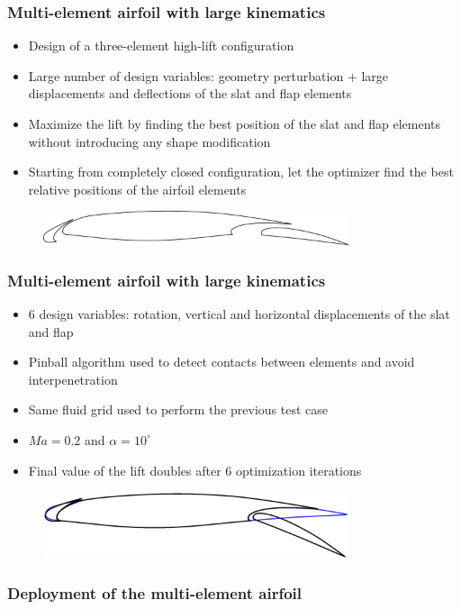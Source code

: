 
\begin{frame}
  \frametitle{Multi-element airfoil with large kinematics}
  \begin{itemize}
  \item Design of a three-element high-lift configuration
  \item Large number of design variables: geometry perturbation + 
        large displacements and deflections of the slat and flap elements
  \item Maximize the lift by finding the best position of the slat and flap
    elements without introducing any shape modification
  \item Starting from completely closed configuration, let the optimizer find 
    the best relative positions of the airfoil elements
  \end{itemize}
  \begin{figure}
    \centering
    \includegraphics[width=0.8\textwidth]{Fig/L1T2_halfopen}
  \end{figure} 
\end{frame}


\begin{frame}
   \frametitle{Multi-element airfoil with large kinematics}
    \begin{itemize}
    \item 6 design variables: rotation, vertical and horizontal displacements of the
      slat and flap 
    \item Pinball algorithm used to detect contacts between elements and
      avoid interpenetration
    \item Same fluid grid used to perform the previous test case
    \item $Ma = 0.2$ and $\alpha = 10^\circ$
    \item Final value of the lift doubles after 6 optimization iterations
    \end{itemize}
    \begin{figure}
      \centering
      \includegraphics[width=0.8\textwidth]{Fig/L1T2_dep}
     \end{figure}
\end{frame}

\begin{frame}
   \frametitle{Deployment of the multi-element airfoil}
  \begin{center}
  \end{center}
\end{frame}

